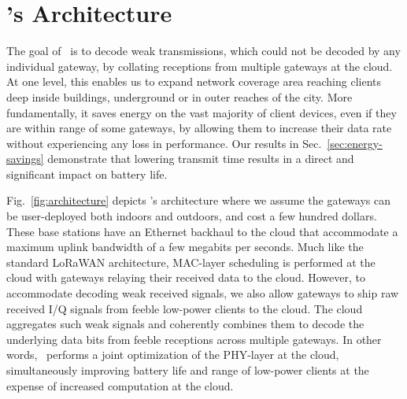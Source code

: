 \section{\name's Architecture}
\label{sec:arch}



The goal of \name\ is to decode weak transmissions, which could not be
decoded by any individual gateway, by collating receptions from multiple
gateways at the cloud. At one level, this  enables us to expand network coverage area reaching clients deep inside buildings, underground or in outer reaches of the city. More fundamentally, it saves energy on the vast majority of client devices, even if they are within range of some gateways, by allowing them to increase their data rate without experiencing any loss in performance. Our results in Sec.~\ref{sec:energy-savings} demonstrate that lowering transmit time results in a direct and significant impact on battery life. 

Fig.~\ref{fig:architecture} depicts \name's architecture where we assume the gateways can be user-deployed  both indoors and outdoors, and cost a few hundred dollars. These base stations have an Ethernet backhaul to the cloud that accommodate a maximum uplink bandwidth of a few megabits per seconds. Much like the standard LoRaWAN architecture, MAC-layer scheduling is performed at the cloud with gateways relaying their received data to the cloud. However, to accommodate decoding weak received signals, we also allow gateways to ship raw received I/Q signals from feeble low-power clients to the cloud. The cloud aggregates such weak signals and coherently combines them to decode the underlying data bits from feeble receptions across multiple gateways. In other words, \name\ performs a joint optimization of the  PHY-layer at the cloud, simultaneously improving battery life and range of low-power clients at the expense of increased computation at the cloud. 

